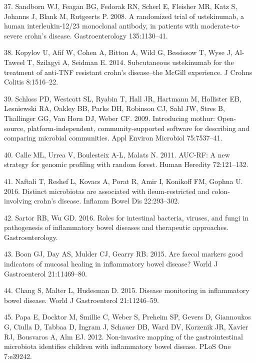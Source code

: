 \documentclass[11pt,]{article}
\begin{document}
\hypertarget{ref-sandborn_ust_2008}{}
37. Sandborn WJ, Feagan BG, Fedorak RN, Scherl E, Fleisher MR, Katz S,
Johanns J, Blank M, Rutgeerts P. 2008. A randomized trial of
ustekinumab, a human interleukin-12/23 monoclonal antibody, in patients
with moderate-to-severe crohn's disease. Gastroenterology 135:1130--41.

\hypertarget{ref-kopylov_ust_2014}{}
38. Kopylov U, Afif W, Cohen A, Bitton A, Wild G, Bessissow T, Wyse J,
Al-Taweel T, Szilagyi A, Seidman E. 2014. Subcutaneous ustekinumab for
the treatment of anti-TNF resistant crohn's disease--the McGill
experience. J Crohns Colitis 8:1516--22.

\hypertarget{ref-schloss_mothur_2009}{}
39. Schloss PD, Westcott SL, Ryabin T, Hall JR, Hartmann M, Hollister
EB, Lesniewski RA, Oakley BB, Parks DH, Robinson CJ, Sahl JW, Stres B,
Thallinger GG, Van Horn DJ, Weber CF. 2009. Introducing mothur:
Open-source, platform-independent, community-supported software for
describing and comparing microbial communities. Appl Environ Microbiol
75:7537--41.

\hypertarget{ref-calle_aucrf_2011}{}
40. Calle ML, Urrea V, Boulesteix A-L, Malats N. 2011. AUC-RF: A new
strategy for genomic profiling with random forest. Human Heredity
72:121--132.

\hypertarget{ref-naftali_tissinvol_2016}{}
41. Naftali T, Reshef L, Kovacs A, Porat R, Amir I, Konikoff FM, Gophna
U. 2016. Distinct microbiotas are associated with ileum-restricted and
colon-involving crohn's disease. Inflamm Bowel Dis 22:293--302.

\hypertarget{ref-sartor_microbesIBD_2016}{}
42. Sartor RB, Wu GD. 2016. Roles for intestinal bacteria, viruses, and
fungi in pathogenesis of inflammatory bowel diseases and therapeutic
approaches. Gastroenterology.

\hypertarget{ref-boon_fmarkers_2015}{}
43. Boon GJ, Day AS, Mulder CJ, Gearry RB. 2015. Are faecal markers good
indicators of mucosal healing in inflammatory bowel disease? World J
Gastroenterol 21:11469--80.

\hypertarget{ref-chang_monitoring_2015}{}
44. Chang S, Malter L, Hudesman D. 2015. Disease monitoring in
inflammatory bowel disease. World J Gastroenterol 21:11246--59.

\hypertarget{ref-papa_pedsIBD_2012}{}
45. Papa E, Docktor M, Smillie C, Weber S, Preheim SP, Gevers D,
Giannoukos G, Ciulla D, Tabbaa D, Ingram J, Schauer DB, Ward DV,
Korzenik JR, Xavier RJ, Bousvaros A, Alm EJ. 2012. Non-invasive mapping
of the gastrointestinal microbiota identifies children with inflammatory
bowel disease. PLoS One 7:e39242.
\end{document}
